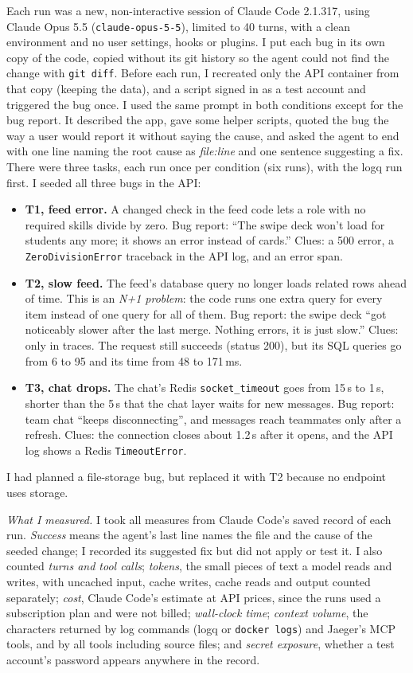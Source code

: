 \documentclass[10pt,conference]{IEEEtran}
\newcommand{\cmd}[1]{\texttt{#1}}
\begin{document}
Each run was a new, non-interactive session of Claude Code 2.1.317, using Claude Opus 5.5 (\cmd{claude-opus-5-5}), limited to 40 turns, with a clean environment and no user settings, hooks or plugins. I put each bug in its own copy of the code, copied without its git history so the agent could not find the change with \cmd{git diff}. Before each run, I recreated only the API container from that copy (keeping the data), and a script signed in as a test account and triggered the bug once. I used the same prompt in both conditions except for the bug report. It described the app, gave some helper scripts, quoted the bug the way a user would report it without saying the cause, and asked the agent to end with one line naming the root cause as \emph{file:line} and one sentence suggesting a fix. There were three tasks, each run once per condition (six runs), with the logq run first. I seeded all three bugs in the API:
\begin{itemize}
\item \textbf{T1, feed error.} A changed check in the feed code lets a role with no required skills divide by zero. Bug report: ``The swipe deck won't load for students any more; it shows an error instead of cards.'' Clues: a 500 error, a \cmd{ZeroDivisionError} traceback in the API log, and an error span.
\item \textbf{T2, slow feed.} The feed's database query no longer loads related rows ahead of time. This is an \emph{N+1 problem}: the code runs one extra query for every item instead of one query for all of them. Bug report: the swipe deck ``got noticeably slower after the last merge. Nothing errors, it is just slow.'' Clues: only in traces. The request still succeeds (status 200), but its SQL queries go from 6 to 95 and its time from 48 to 171\,ms.
\item \textbf{T3, chat drops.} The chat's Redis \cmd{socket\_timeout} goes from 15\,s to 1\,s, shorter than the 5\,s that the chat layer waits for new messages. Bug report: team chat ``keeps disconnecting'', and messages reach teammates only after a refresh. Clues: the connection closes about 1.2\,s after it opens, and the API log shows a Redis \cmd{TimeoutError}.
\end{itemize}
I had planned a file-storage bug, but replaced it with T2 because no endpoint uses storage.

\emph{What I measured.} I took all measures from Claude Code's saved record of each run. \emph{Success} means the agent's last line names the file and the cause of the seeded change; I recorded its suggested fix but did not apply or test it. I also counted \emph{turns and tool calls}; \emph{tokens}, the small pieces of text a model reads and writes, with uncached input, cache writes, cache reads and output counted separately; \emph{cost}, Claude Code's estimate at API prices, since the runs used a subscription plan and were not billed; \emph{wall-clock time}; \emph{context volume}, the characters returned by log commands (logq or \cmd{docker logs}) and Jaeger's MCP tools, and by all tools including source files; and \emph{secret exposure}, whether a test account's password appears anywhere in the record.
\end{document}
